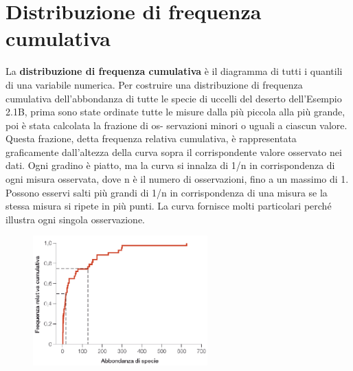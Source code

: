 \documentclass[10pt, draft]{book}
\begin{document}
\section{Distribuzione di frequenza cumulativa}
La \textbf{distribuzione di frequenza cumulativa} è il diagramma di tutti i quantili di una variabile numerica. Per costruire una distribuzione di frequenza cumulativa dell'abbondanza di tutte le specie di uccelli del deserto dell'Esempio 2.1B, prima sono state ordinate tutte le misure dalla più piccola alla più grande, poi è stata calcolata la frazione di os- servazioni minori o uguali a ciascun valore. Questa frazione, detta frequenza relativa cumulativa, è rappresentata graficamente dall'altezza della curva sopra il corrispondente valore osservato nei dati. Ogni gradino è piatto, ma la curva si innalza di 1/n in corrispondenza di ogni misura osservata, dove n è il numero di osservazioni, fino a un massimo di 1. Possono esservi salti più grandi di 1/n in corrispondenza di una misura se la stessa misura si ripete in più punti. La curva fornisce molti particolari perché illustra ogni singola osservazione.
    \begin{figure}[h]\label{fig2.2-1}
    \centering
    \includegraphics[width=0.6\textwidth]{fig2.2-1}
    \caption{\small{}}
    \end{figure}
\end{document}
